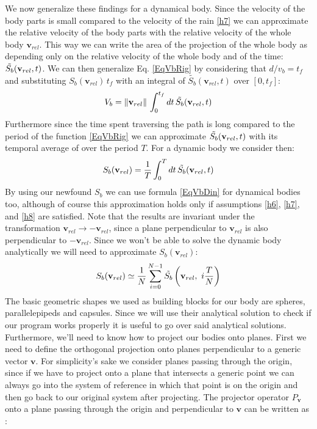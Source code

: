 \documentclass[a4paper,12pt]{article}
\begin{document}
We now generalize these findings for a dynamical body. Since the velocity of the body parts is small compared to the velocity of the rain \ref{h7} we can approximate the relative velocity of the body parts with the relative velocity of the whole body $\mathbf{v}_{rel}$. This way we can write the area of the projection of the whole body as depending only on the relative velocity of the whole body and of the time:  $\Tilde{S_b}(\mathbf{v}_{rel} , t)$. We can then generalize Eq. \ref{EqVbRig} by considering that $d/v_b = t_f$ and substituting $S_b(\mathbf{v}_{rel}) \, t_f$ with an integral of $\tilde{S_b}(\mathbf{v}_{rel}, t)$ over $[0, t_f]$:
%
\begin{equation}\label{EqVbDin}
V_b = \norm{\mathbf{v}_{rel}}\, \int_{0}^{t_f} dt \, \tilde{S_b}(\mathbf{v}_{rel}, t)
\end{equation} 
%
Furthermore since the time spent traversing the path is long compared to the period of the function \ref{EqVbRig} we can approximate $\Tilde{S_b}(\mathbf{v}_{rel} , t)$ with its temporal average of over the period $T$. For a dynamic body we consider then:
%
\begin{equation}\label{EqSbDin}
S_b(\mathbf{v}_{rel}) = \frac{1}{T} \int_{0}^{T} dt\, \Tilde{S_b}(\mathbf{v}_{rel} , t)
\end{equation} 
%
By using our newfound $S_b$ we can use formula \ref{EqVbDin} for dynamical bodies too, although of course this approximation holds only if assumptions \ref{h6}, \ref{h7}, and \ref{h8} are satisfied. Note that the results are invariant under the transformation $\mathbf{v}_{rel} \rightarrow -\mathbf{v}_{rel}$, since a plane perpendicular to $\mathbf{v}_{rel}$ is also perpendicular to $-\mathbf{v}_{rel}$. Since we won't be able to solve the dynamic body analytically we will need to approximate $S_b(\mathbf{v}_{rel})$: 
%
\begin{equation}\label{EqSbApp}
S_b(\mathbf{v}_{rel}) \simeq \frac{1}{N} \sum_{i = 0}^{N-1}  \Tilde{S_b}\left(\mathbf{v}_{rel} ,\  i\frac{T}{N} \right)
\end{equation} 
%
The basic geometric shapes we used as building blocks for our body are spheres, parallelepipeds and capsules. Since we will use their analytical solution to check if our program works properly it is useful to go over said analytical solutions. Furthermore, we'll need to know how to project our bodies onto planes.
First we need to define the orthogonal projection onto planes perpendicular to a generic vector $\mathbf{v}$.
For simplicity's sake we consider planes passing through the origin, since if we have to project onto a plane that intersects a generic point we can always go into the system of reference in which that point is on the origin and then go back to our original system after projecting. The projector operator $P_\mathbf{v}$ onto a plane passing through the origin and perpendicular to $\mathbf{v}$ can be written as \cite{Lay}:
\end{document}
